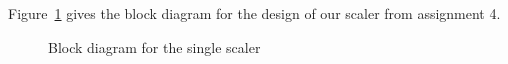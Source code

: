 
Figure~\ref{fig:design:block} gives the block diagram for the design of our scaler from assignment 4.

\begin{figure}[h]
	\centering
	\def\svgwidth{0.6\textwidth}
	
	\caption{Block diagram for the single scaler}
	\label{fig:design:block}
\end{figure}
